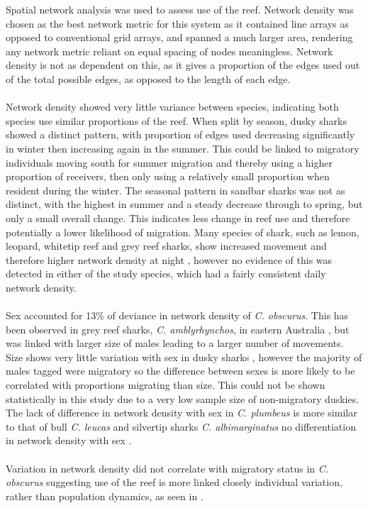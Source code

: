 \documentclass[11pt,a4paper]{article}
\begin{document}
	Spatial network analysis was used to assess use of the reef. Network density was chosen as the best network metric for this system as it contained line arrays as opposed to conventional grid arrays, and spanned a much larger area, rendering any network metric reliant on equal spacing of nodes meaningless. Network density is not as dependent on this, as it gives a proportion of the edges used out of the total possible edges, as opposed to the length of each edge.\\
	\\
	Network density showed very little variance between species, indicating both species use similar proportions of the reef. When split by season, dusky sharks showed a distinct pattern, with proportion of edges used decreasing significantly in winter then increasing again in the summer. This could be linked to migratory individuals moving south for summer migration and thereby using a higher proportion of receivers, then only using a relatively small proportion when resident during the winter. The seasonal pattern in sandbar sharks was not as distinct, with the highest in summer and a steady decrease through to spring, but only a small overall change. This indicates less change in reef use and therefore potentially a lower likelihood of migration. Many species of shark, such as lemon, leopard, whitetip reef and grey reef sharks, show increased movement and therefore higher network density at night \citep{Speed2010}, however no evidence of this was detected in either of the study species, which had a fairly consistent daily network density.\\
	\\
	Sex accounted for 13\% of deviance in network density of \textit{C. obscurus}. This has been observed in grey reef sharks, \textit{C. amblyrhynchos}, in eastern Australia \citep{Espinoza2015}, but was linked with larger size of males leading to a larger number of movements. Size shows very little variation with sex in dusky sharks \citep{Braccini2017b}, however the majority of males tagged were migratory so the difference between sexes is more likely to be correlated with proportions migrating than size. This could not be shown statistically in this study due to a very low sample size of non-migratory duskies. The lack of difference in network density with sex in \textit{C. plumbeus} is more similar to that of bull \textit{C. leucas} and silvertip sharks \textit{C. albimarginatus} no differentiation in network density with sex \citep{Espinoza2015}.\\
	\\
	Variation in network density did not correlate with migratory status in \textit{C. obscurus} suggesting use of the reef is more linked closely individual variation, rather than population dynamics, as seen in \citealt{Lea2016}.
	
\end{document}
